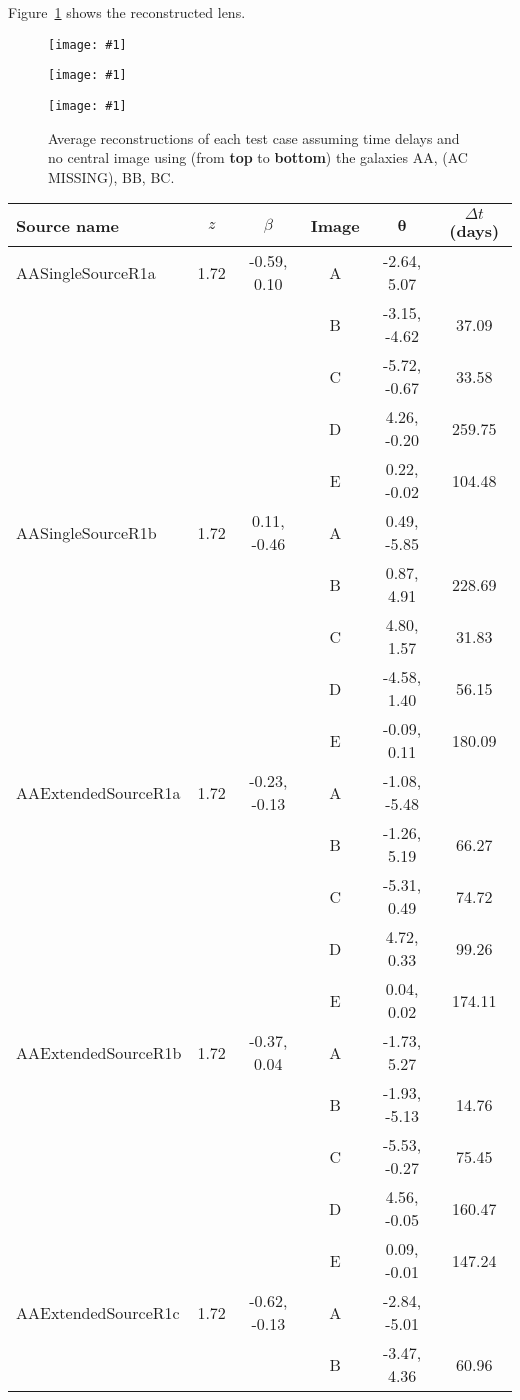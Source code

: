 \documentclass[onecolumn,galley]{mn2e}
\newcommand{\tabref}[1] {Table~\ref{#1}}
\newcommand{\figref}[1] {Figure~\ref{#1}}
\renewcommand{\vec}[1]{\ensuremath{\boldsymbol{#1}}}
\newcommand\plotone[1]{%
 \centering
 \leavevmode
 \texttt{[image: \#1]}%
}%
\begin{document}
\figref{Test reconstructions} shows the reconstructed lens.

\begin{figure}
\plotone{AAarrival_surfaces}
\plotone{BBarrival_surfaces}
\plotone{BCarrival_surfaces}
\caption{Average reconstructions of each test case assuming time delays and no central image
using (from \textbf{top} to \textbf{bottom}) the galaxies AA, (AC MISSING), BB, BC.}
\label{Test reconstructions}
\end{figure}

\begin{table}
\begin{tabular}{lccccc}
Source name & $z$ & $\beta$ & Image & $\vec\theta$ & $\Delta t$ (days) \\
\hline
AASingleSourceR1a & 1.72 & -0.59, 0.10 & A & -2.64, 5.07 & \\
 & & & B & -3.15, -4.62 & 37.09\\
 & & & C & -5.72, -0.67 & 33.58\\
 & & & D & 4.26, -0.20 & 259.75\\
 & & & E & 0.22, -0.02 & 104.48\\
AASingleSourceR1b & 1.72 & 0.11, -0.46 & A & 0.49, -5.85 & \\
 & & & B & 0.87, 4.91 & 228.69\\
 & & & C & 4.80, 1.57 & 31.83\\
 & & & D & -4.58, 1.40 & 56.15\\
 & & & E & -0.09, 0.11 & 180.09\\
AAExtendedSourceR1a & 1.72 & -0.23, -0.13 & A & -1.08, -5.48 & \\
 & & & B & -1.26, 5.19 & 66.27\\
 & & & C & -5.31, 0.49 & 74.72\\
 & & & D & 4.72, 0.33 & 99.26\\
 & & & E & 0.04, 0.02 & 174.11\\
AAExtendedSourceR1b & 1.72 & -0.37, 0.04 & A & -1.73, 5.27 & \\
 & & & B & -1.93, -5.13 & 14.76\\
 & & & C & -5.53, -0.27 & 75.45\\
 & & & D & 4.56, -0.05 & 160.47\\
 & & & E & 0.09, -0.01 & 147.24\\
AAExtendedSourceR1c & 1.72 & -0.62, -0.13 & A & -2.84, -5.01 & \\
 & & & B & -3.47, 4.36 & 60.96\\

\end{tabular}
\end{table}
\end{document}
